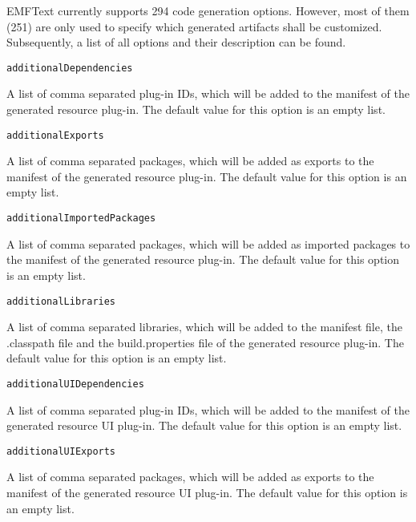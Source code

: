 EMFText currently supports 294 code generation options. However, most of them (251) are only used to specify which generated artifacts shall be customized. Subsequently, a list of all options and their description can be found.

\vspace{1cm}\noindent\texttt{additionalDependencies}
\begin{myindentpar}{1cm}
A list of comma separated plug-in IDs, which will be added to the manifest of the generated resource plug-in. The default value for this option is an empty list.
\end{myindentpar}

\noindent\texttt{additionalExports}
\begin{myindentpar}{1cm}
A list of comma separated packages, which will be added as exports to the manifest of the generated resource plug-in. The default value for this option is an empty list.
\end{myindentpar}

\noindent\texttt{additionalImportedPackages}
\begin{myindentpar}{1cm}
A list of comma separated packages, which will be added as imported packages to the manifest of the generated resource plug-in. The default value for this option is an empty list.
\end{myindentpar}

\noindent\texttt{additionalLibraries}
\begin{myindentpar}{1cm}
A list of comma separated libraries, which will be added to the manifest file, the .classpath file and the build.properties file of the generated resource plug-in. The default value for this option is an empty list.
\end{myindentpar}

\noindent\texttt{additionalUIDependencies}
\begin{myindentpar}{1cm}
A list of comma separated plug-in IDs, which will be added to the manifest of the generated resource UI plug-in. The default value for this option is an empty list.
\end{myindentpar}

\noindent\texttt{additionalUIExports}
\begin{myindentpar}{1cm}
A list of comma separated packages, which will be added as exports to the manifest of the generated resource UI plug-in. The default value for this option is an empty list.
\end{myindentpar}

